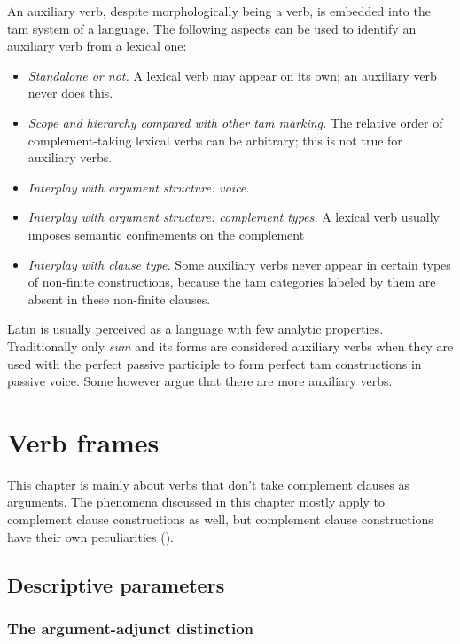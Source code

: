 \documentclass[a4paper, oneside, 12pt]{report}
\newcommand{\form}[1]{\emph{#1}}
\begin{document}
An auxiliary verb, despite morphologically being a verb, 
is embedded into the \ac{tam} system of a language.
The following aspects can be used to identify 
an auxiliary verb from a lexical one:
\begin{itemize}
    \item \emph{Standalone or not.} A lexical verb may appear on its own;
    an auxiliary verb never does this.
    \item \emph{Scope and hierarchy compared with other \ac{tam} marking.} 
    The relative order of complement-taking lexical verbs can be arbitrary;
    this is not true for auxiliary verbs. 
    \item \emph{Interplay with argument structure: voice}.
    \item \emph{Interplay with argument structure: complement types.} 
    A lexical verb usually imposes semantic confinements on the complement 
    \item \emph{Interplay with clause type.} 
    Some auxiliary verbs never appear in certain types of non-finite constructions, 
    because the \ac{tam} categories labeled by them 
    are absent in these non-finite clauses.
\end{itemize}


Latin is usually perceived as a language with few analytic properties.
Traditionally only \form{sum} and its forms are considered auxiliary verbs
when they are used with the perfect passive participle to form
perfect \ac{tam} constructions in passive voice.
Some however argue that there are more auxiliary verbs.

\chapter{Verb frames}\label{chap:verb-frame}

This chapter is mainly about verbs that don't take complement clauses as arguments.
The phenomena discussed in this chapter mostly apply to complement clause constructions as well,
but complement clause constructions have their own peculiarities 
().

\section{Descriptive parameters}

\subsection{The argument-adjunct distinction}
\end{document}
